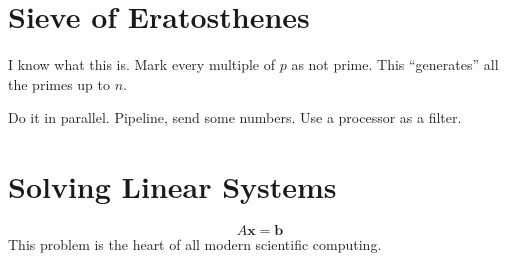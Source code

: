 \documentclass[12pt]{article}
\numberwithin{equation}{section}
\newcommand{\vect}[1] {\mathbf{#1}} %
\theoremstyle{theorem}
\theoremstyle{definition}
\theoremstyle{remark}
\begin{document}
\date{April 28, 2015}
\section{Sieve of Eratosthenes}
I know what this is.  Mark every multiple of $p$ as not prime.  This ``generates'' all the primes up to $n$. 

Do it in parallel.  Pipeline, send some numbers. Use a processor as a filter.

\section{Solving Linear Systems}
\begin{equation}
A\vect{x} = \vect{b}
\end{equation}
This problem is the heart of all modern scientific computing. 
\end{document}
